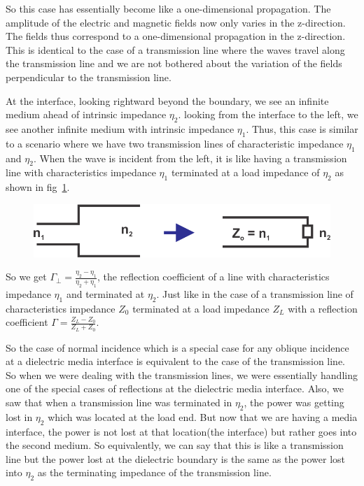 So this case has essentially become like a one-dimensional propagation. The amplitude of the electric and magnetic fields now only varies in the z-direction. The fields thus correspond to a one-dimensional propagation in the z-direction. This is identical to the case of a transmission line where the waves travel along the transmission line and we are not bothered about the variation of the fields perpendicular to the transmission line.

At the interface, looking rightward beyond the boundary, we see an infinite medium ahead of intrinsic impedance $\eta_{2}$. looking from the interface to the left, we see another infinite medium with intrinsic impedance $\eta_{1}$. Thus, this case is similar to a scenario where we have two transmission lines of characteristic impedance $\eta_{1}$ and $\eta_{2}$. When the wave is incident from the left, it is like having a transmission line with characteristics impedance  $\eta_{1}$ terminated at a load impedance of  $\eta_{2}$ as shown in fig~\ref{fig:17}.
\begin{figure}[h]
\centering
\includegraphics[width=1\linewidth]{./graphics/17}
\caption{}
\label{fig:17}
\end{figure}

So we get $\Gamma_{\perp} = \frac{\eta_{2} - \eta_{1}}{\eta_{2} + \eta_{1}}$, the reflection coefficient of a line with characteristics impedance  $\eta_{1}$ and terminated at  $\eta_{2}$. Just like in the case of a transmission line of characteristics impedance $Z_{0}$ terminated at a load impedance $Z_{L}$ with a reflection coefficient $\Gamma = \frac{Z_{L} - Z_{0}}{Z_{L} + Z_{0}}$.

So the case of normal incidence which is a special case for any oblique incidence at a dielectric media interface is equivalent to the case of the transmission line. So when we were dealing with the transmission lines, we were essentially handling one of the special cases of reflections at the dielectric media interface. Also, we saw that when a transmission line was terminated in  $\eta_{2}$, the power was getting lost in  $\eta_{2}$ which was located at the load end. But now that we are having a media interface,  the power is not lost at that location(the interface) but rather goes into the second medium. So equivalently, we can say that this is like a transmission line but the power lost at the dielectric boundary is the same as the power lost into  $\eta_{2}$ as the terminating impedance of the transmission line. 

